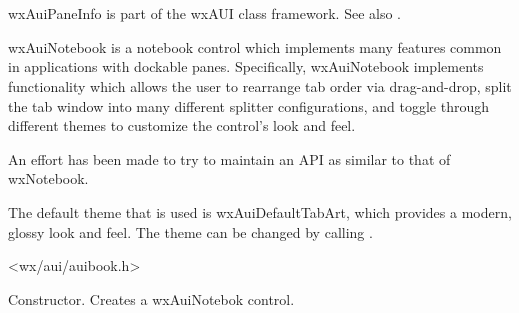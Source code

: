 %
%

\section{}\label{wxauinotebook}

wxAuiPaneInfo is part of the wxAUI class framework.
See also .

wxAuiNotebook is a notebook control which implements many features common in applications with dockable panes.
Specifically, wxAuiNotebook implements functionality which allows the user to rearrange tab order via drag-and-drop,
split the tab window into many different splitter configurations, and toggle through different themes to customize
the control's look and feel.

An effort has been made to try to maintain an API as similar to that of wxNotebook.

The default theme that is used is wxAuiDefaultTabArt, which provides a modern, glossy look and feel.
The theme can be changed by calling .




<wx/aui/auibook.h>



\label{wxauinotebookwxauinotebook}



Constructor. Creates a wxAuiNotebok control.

\label{wxauinotebookaddpage}


